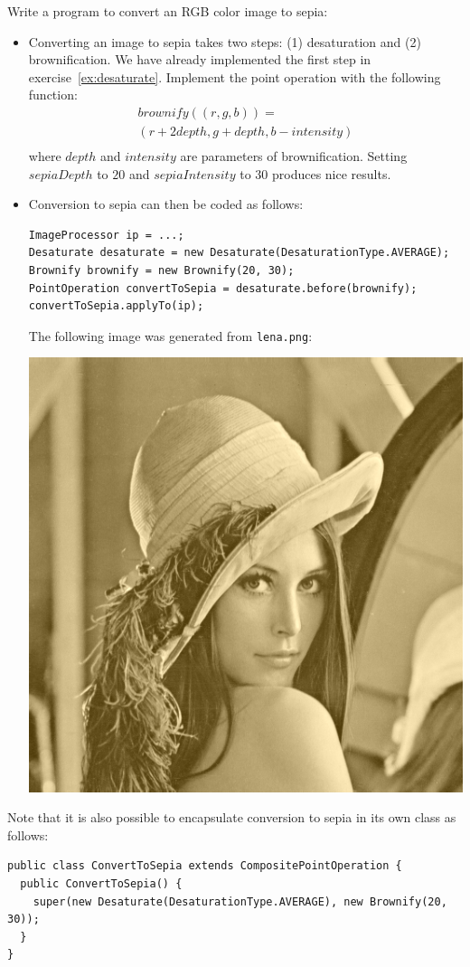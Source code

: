 \documentclass{book}
\begin{document}
\begin{exercise}
Write a program to convert an RGB color image to sepia:
\begin{itemize}
  \item Converting an image to sepia takes two steps: (1) desaturation and (2) brownification. We have already implemented the first step in exercise~\ref{ex:desaturate}. Implement the point operation  with the following function:
  $$\begin{array}{c}
brownify((r, g, b)) = \\
(r+ 2{depth}, g + {depth}, b - {intensity})\\
\end{array}$$
where  ${depth}$ and ${intensity}$ are parameters of brownification.  Setting ${sepiaDepth}$ to $20$  and ${sepiaIntensity}$ to $30$ produces nice results. 
  \item Conversion to sepia can then be coded as follows:
\begin{lstlisting}
ImageProcessor ip = ...;
Desaturate desaturate = new Desaturate(DesaturationType.AVERAGE);
Brownify brownify = new Brownify(20, 30);
PointOperation convertToSepia = desaturate.before(brownify);
convertToSepia.applyTo(ip);
\end{lstlisting}
The following image was generated from \texttt{lena.png}:
\begin{center}
\includegraphics[scale=0.20]{lena-sepia.png}
\end{center}
\end{itemize} 
\end{exercise}
Note that it is also possible to encapsulate conversion to sepia in its own class as follows:
\begin{lstlisting}
public class ConvertToSepia extends CompositePointOperation {
  public ConvertToSepia() {
    super(new Desaturate(DesaturationType.AVERAGE), new Brownify(20, 30));  
  }
}
\end{lstlisting}
\end{document}
